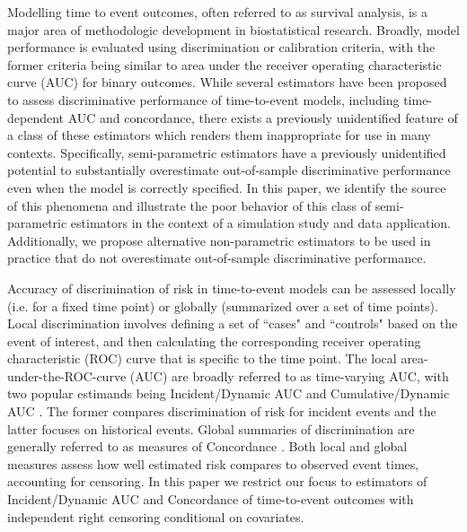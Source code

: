 \documentclass[useAMS,usenatbib, referee]{biom}
\begin{document}
Modelling time to event outcomes, often referred to as survival analysis, is a major area of methodologic development in biostatistical research. Broadly, model performance is evaluated using discrimination or calibration criteria, with the former criteria being similar to area under the receiver operating characteristic curve (AUC) for binary outcomes. While several estimators have been proposed to assess discriminative performance of time-to-event models, including time-dependent AUC and concordance, there exists a previously unidentified feature of a class of these estimators which renders them inappropriate for use in many contexts. Specifically, semi-parametric estimators have a previously unidentified potential to substantially overestimate out-of-sample discriminative performance even when the model is correctly specified. In this paper, we identify the source of this phenomena and illustrate the poor behavior of this class of semi-parametric estimators in the context of a simulation study and data application. Additionally, we propose alternative non-parametric estimators to be used in practice that do not overestimate out-of-sample discriminative performance.


Accuracy of discrimination of risk in time-to-event models can be assessed locally (i.e. for a fixed time point) or globally (summarized over a set of time points). Local discrimination involves defining a set of ``cases" and ``controls" based on the event of interest, and then calculating the corresponding receiver operating characteristic (ROC) curve that is specific to the time point. The local area-under-the-ROC-curve (AUC) are broadly referred to as time-varying AUC, with two popular estimands being Incident/Dynamic AUC and Cumulative/Dynamic AUC \citep{hz2005}. The former compares discrimination of risk for incident events and the latter focuses on historical events. Global summaries of discrimination are generally referred to as measures of Concordance \citep{Harrell1996}. Both local and global measures assess how well estimated risk compares to observed event times, accounting for censoring. In this paper we restrict our focus to estimators of Incident/Dynamic AUC and Concordance of time-to-event outcomes with independent right censoring conditional on covariates.
\end{document}
